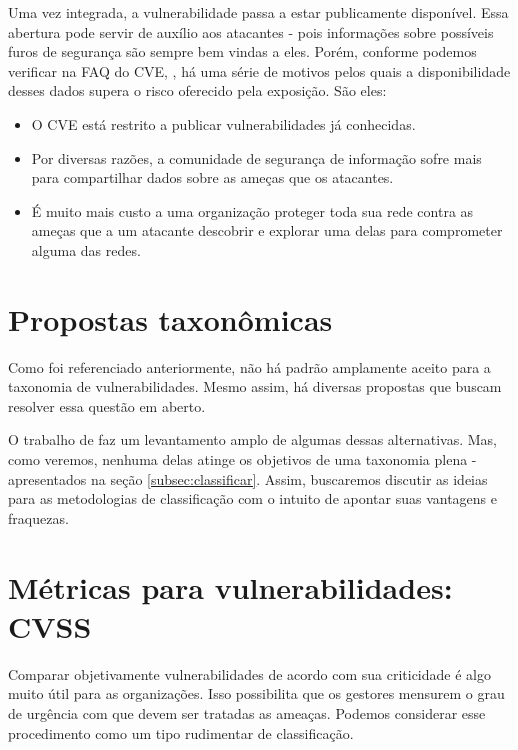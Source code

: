 			
			Uma vez integrada, a vulnerabilidade passa a estar publicamente disponível.
			Essa abertura pode servir de auxílio aos atacantes - pois informações
			sobre possíveis furos de segurança são sempre bem vindas a eles.
			Porém, conforme podemos verificar na FAQ do CVE, \cite{CVE2010}, há uma série
			de motivos pelos quais a disponibilidade desses dados supera o risco
			oferecido pela exposição. São eles:
			\begin{itemize}
				\item{O CVE está restrito a publicar vulnerabilidades já conhecidas.}
				\item{Por diversas razões, a comunidade de segurança de informação
					sofre mais para compartilhar dados sobre as ameças
					que os atacantes.}
				\item{É muito mais custo a uma organização proteger toda sua rede
					contra as ameças que a um atacante descobrir e explorar uma delas para
					comprometer alguma das redes.}
			\end{itemize}
			
			
		
		
	\section{Propostas taxonômicas}
		Como foi referenciado anteriormente, não há padrão amplamente aceito
		para a taxonomia de vulnerabilidades.
		Mesmo assim, há diversas propostas que buscam resolver essa questão em aberto.
		
		
		O trabalho de \cite{Gregio2005} faz um levantamento amplo de algumas
		dessas alternativas. Mas, como veremos, nenhuma delas atinge os objetivos
		de uma taxonomia plena - apresentados na seção \ref{subsec:classificar}.
		Assim, buscaremos discutir as ideias para as metodologias
		de classificação com o intuito de apontar suas vantagens e fraquezas.

	\section{Métricas para vulnerabilidades: CVSS}
		Comparar objetivamente vulnerabilidades de acordo com sua criticidade é
		algo muito útil para as organizações.
		Isso possibilita que os gestores mensurem o grau de urgência com que devem
		ser tratadas as ameaças. Podemos considerar esse procedimento
		como um tipo rudimentar de classificação. 

